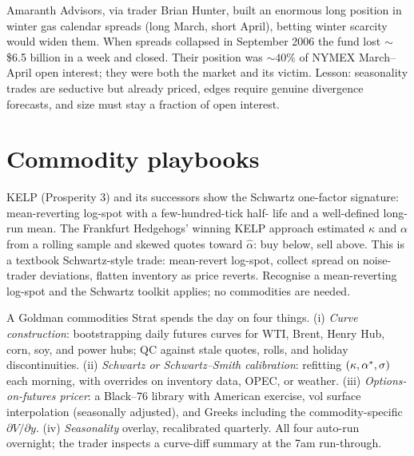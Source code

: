 \begin{historybox}[title={Amaranth 2006: \$6B on a gas-spread bet}]
Amaranth Advisors, via trader Brian Hunter, built an enormous long
position in winter gas calendar spreads (long March, short April),
betting winter scarcity would widen them.  When spreads collapsed
in September 2006 the fund lost $\sim$\$6.5 billion in a week and
closed.  Their position was $\sim 40\%$ of NYMEX March--April open
interest; they were both the market and its victim.  Lesson:
seasonality trades are seductive but already priced, edges require
genuine divergence forecasts, and size must stay a fraction of
open interest.
\end{historybox}


\section{Commodity playbooks}
\label{sec:commodity_playbooks}

\begin{prosperitybox}[title={Schwartz-like dynamics in Prosperity}]
KELP (Prosperity 3) and its successors show the Schwartz one-factor
signature: mean-reverting log-spot with a few-hundred-tick half-
life and a well-defined long-run mean.  The Frankfurt Hedgehogs'
winning KELP approach estimated $\kappa$ and $\alpha$ from a
rolling sample and skewed quotes toward $\hat\alpha$: buy below,
sell above.  This is a textbook Schwartz-style trade: mean-revert
log-spot, collect spread on noise-trader deviations, flatten
inventory as price reverts.  Recognise a mean-reverting log-spot
and the Schwartz toolkit applies; no commodities are needed.
\end{prosperitybox}

\begin{gsbox}[title={Commodities Strats on the trading floor}]
A Goldman commodities Strat spends the day on four things.
(i) \emph{Curve construction}: bootstrapping daily futures curves
for WTI, Brent, Henry Hub, corn, soy, and power hubs; QC against
stale quotes, rolls, and holiday discontinuities.
(ii) \emph{Schwartz or Schwartz--Smith calibration}: refitting
$(\kappa, \alpha^*, \sigma)$ each morning, with overrides on
inventory data, OPEC, or weather.
(iii) \emph{Options-on-futures pricer}: a Black--76 library with
American exercise, vol surface interpolation (seasonally adjusted),
and Greeks including the commodity-specific
$\partial V / \partial y$.
(iv) \emph{Seasonality} overlay, recalibrated quarterly.  All four
auto-run overnight; the trader inspects a curve-diff summary at the
7am run-through.
\end{gsbox}


